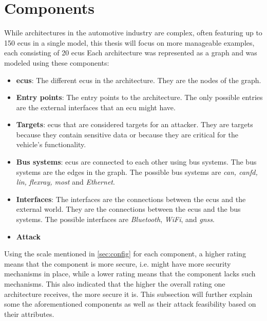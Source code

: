 \section{Components}
\label{sec:components}

While architectures in the automotive industry are complex, often featuring up to 150 \acrshort{ecu}s in a single model, 
this thesis will focus on more manageable examples, each consisting of 20 \acrshort{ecu}s
Each architecture was represented as a graph and was modeled using these components:

\begin{itemize}

    \item \textbf{\acrshort{ecu}s}: The different \acrshort{ecu}s in the architecture. They are the nodes of the graph.
    
    \item \textbf{Entry points}: The entry points to the architecture. The only possible entries are the external interfaces that an \acrshort{ecu} might have.
    
    \item \textbf{Targets}: \acrshort{ecu}s that are considered targets for an attacker. They are targets because they contain sensitive data or because they are critical for the vehicle's functionality.
    
    \item \textbf{Bus systems}: \acrshort{ecu}s are connected to each other using bus systems. The bus systems are the edges in the graph. The possible bus systems are \textit{\acrshort{can}, \acrshort{canfd}, \acrshort{lin}, \acrshort{flexray}, \acrshort{most}} and \textit{Ethernet}.
    
    \item \textbf{Interfaces}: The interfaces are the connections between the \acrshort{ecu}s and the external world. They are the connections between the \acrshort{ecu}s and the bus systems. 
    The possible interfaces are \textit{Bluetooth}, \textit{WiFi}, and \textit{\acrshort{gnss}}.
    
    \item \textbf{Attack }
    
\end{itemize}

Using the scale mentioned in \ref{sec:config} for each component, a higher rating means that the component is more secure, i.e. might have more security mechanisms in place,
while a lower rating means that the component lacks such mechanisms.
This also indicated that the higher the overall rating one architecture receives, the more secure it is.
This subsection will further explain some the aforementioned components as well as their attack feasibility based on their attributes.

